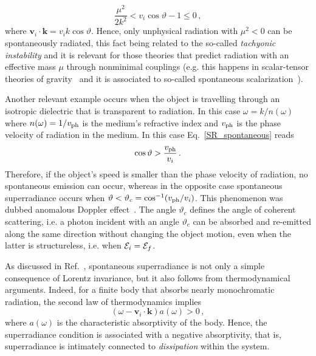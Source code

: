 \documentclass[11pt]{article}
\numberwithin{equation}{section} %
\begin{document}
\begin{equation}
 \frac{\mu^2}{2k^2}<v_i\cos\vartheta-1\leq0\,,
\end{equation}
where $\mathbf{v}_i\cdot \mathbf{k}=v_i k \cos\vartheta$. Hence, only unphysical radiation with $\mu^2<0$ can be spontaneously radiated, this fact being related to the so-called \emph{tachyonic instability} and it is relevant for those theories that predict radiation with an effective mass $\mu$ through nonminimal couplings (e.g. this happens in scalar-tensor theories of gravity~\cite{Will:2005va} and it is associated to so-called spontaneous scalarization~\cite{Damour:1993hw}).

Another relevant example occurs when the object is travelling through an isotropic dielectric that is transparent to radiation. In this case $\omega=k/n(\omega)$ where $n(\omega)=1/v_{\rm ph}$ is the medium's refractive index and $v_{\rm ph}$ is the phase velocity of radiation in the medium. In this case Eq.~\eqref{SR_spontaneous} reads
\begin{equation}
 \cos\vartheta>\frac{v_{\rm ph}}{v_i}\,.
\end{equation}
Therefore, if the object's speed is smaller than the phase velocity of radiation, no spontaneous emission can occur, whereas in the opposite case spontaneous superradiance occurs when $\vartheta<\vartheta_c=\cos^{-1}(v_{\rm ph}/v_i)$. This phenomenon was dubbed anomalous Doppler effect~\cite{Ginzburg:1945zz,Ginzburg:1947}. The angle $\vartheta_c$ defines the angle of coherent scattering, i.e. a photon incident with an angle $\vartheta_c$ can be absorbed and re-emitted along the same direction without changing the object motion, even when the latter is structureless, i.e. when ${\cal E}_i={\cal E}_f$.

As discussed in Ref.~\cite{Bekenstein:1998nt}, spontaneous superradiance is not only a simple consequence of Lorentz invariance, but it also follows from thermodynamical arguments. Indeed, for a finite body that absorbs nearly monochromatic radiation, the second law of thermodynamics implies
\begin{equation}
 (\omega-\mathbf{v}_i\cdot\mathbf{k})a(\omega)>0\,,
\end{equation}
where $a(\omega)$ is the characteristic absorptivity of the body. Hence, the superradiance condition is associated with a negative absorptivity, that is, superradiance is intimately connected to \emph{dissipation} within the system.
\end{document}
